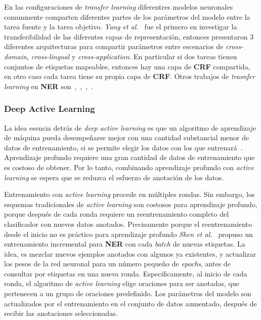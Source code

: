En las configuraciones de \emph{transfer learning} diferentres modelos neuronales comunmente comparten diferentes partes de los par\'ametros del modelo entre la tarea fuente y la tarea objetivo. \emph{Yang et al.}~\cite{yang2017transfer} fue el primero en investigar la transferibilidad de las diferentes capas de representaci\'on, entonces presentaron 3 diferentes arquitecturas para compartir par\'ametros entre escenarios de \emph{cross-domain}, \emph{cross-lingual} y  \emph{cross-application}. En particular si dos tareas tienen conjuntos de etiquetas mapeables, entonces hay una capa de \textbf{CRF} compartida, en otro caso cada tarea tiene su propia capa de \textbf{CRF}. Otros trabajos de \emph{trasnfer learning} en \textbf{NER} son~\cite{von2017transfer},~\cite{zhao2018improve},~\cite{lin2018neural},~\cite{giorgi2018transfer}.

\subsubsection{Deep Active Learning}

La idea esencia detr\'as de \emph{deep active learning} es que un algoritmo de aprendizaje de m\'aquina pueda desempe\~narse mejor con una cantidad substancial menor de datos de entrenamiento, si se permite elegir los datos con los que entrenar\'a~\cite{settles2012active}. Aprendizaje profundo requiere una gran cantidad de datos de entrenamiento que es costoso de obtener. Por lo tanto, combinando aprendizaje profundo con \emph{active learning} se espera que se reduzca el esfuerzo de anotaci\'on de los datos.

Entrenamiento con \emph{active learning} procede en m\'ultiples rondas. Sin embargo, los esquemas tradicionales de \emph{active learning} son costosos para aprendizaje profundo, porque despu\'es de cada ronda requiere un reentrenamiento completo del clasificador con nuevos datos anotados. Precisamente porque el reentrenamiento desde el inicio no es pr\'actico para aprendizaje profundo \emph{Shen et al.}~\cite{shen2017deep} propuso un entrenamiento incremental para \textbf{NER} con cada \emph{batch} de nuevas etiquetas. La idea, es mezclar nuevos ejemplos anotados con algunos ya existentes, y actualizar los pesos de la red neuronal para un n\'umero peque\~no de \emph{epochs}, antes de consultar por etiquetas en una nueva ronda. Espec\'ificamente, al inicio de cada ronda, el algoritmo de \emph{active learning} elige oraciones para ser anotadas, que pertenecen a un grupo de oraciones predefinido. Los par\'ametros del modelo son actualizados por el entrenamiento en el conjunto de datos aumentado, despu\'es de recibir las anotaciones seleccionadas.

